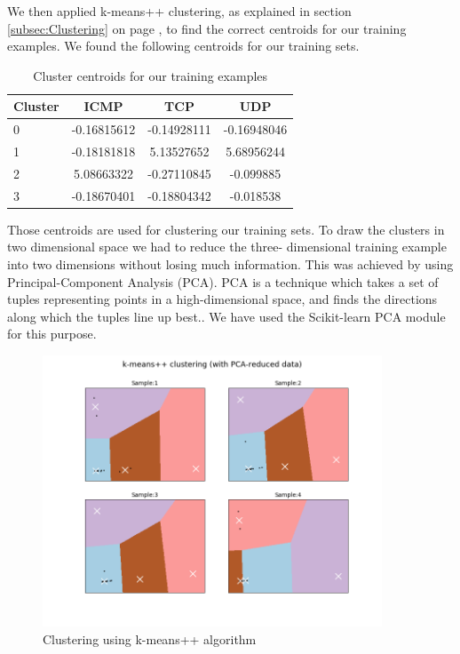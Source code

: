 \documentclass[12pt,oneside,a4paper]{article}
\begin{document}
We then applied k-means++ clustering, as explained in section \ref{subsec:Clustering} on page \pageref{subsec:Clustering}, to find the correct centroids for our training examples. We found the following centroids for our training sets.

\begin{table}[H]
\centering
  \begin{tabular}{ l | c  c  c }
    Cluster      & ICMP  & TCP  & UDP \\
    \hline
    0         &{-0.16815612}       &{-0.14928111}    &{-0.16948046} \\
    1         &{-0.18181818}       &{5.13527652}     &{5.68956244} \\
    2         &{5.08663322}        &{-0.27110845}    &{-0.099885} \\
    3         &{-0.18670401}       &{-0.18804342}    &{-0.018538} \\
  \end{tabular}
\caption{Cluster centroids for our training examples} \label{table:centroids}
\end{table}

Those centroids are used for clustering our training sets. To draw the clusters in two dimensional space we had to reduce the three- dimensional training example into two dimensions without losing much information. This was achieved by using Principal-Component Analysis (PCA). PCA is a technique which takes a set of tuples representing points in a high-dimensional space, and finds the directions along which the tuples line up best.\cite{pca}. We have used the Scikit-learn PCA module for this purpose.

\begin{figure}[H]
\centering
\includegraphics[width=0.90\textwidth]{kemans-clustering.png}
\caption{Clustering using k-means++ algorithm} \label{fig:k-means-clustering}
\end{figure}
\end{document}
